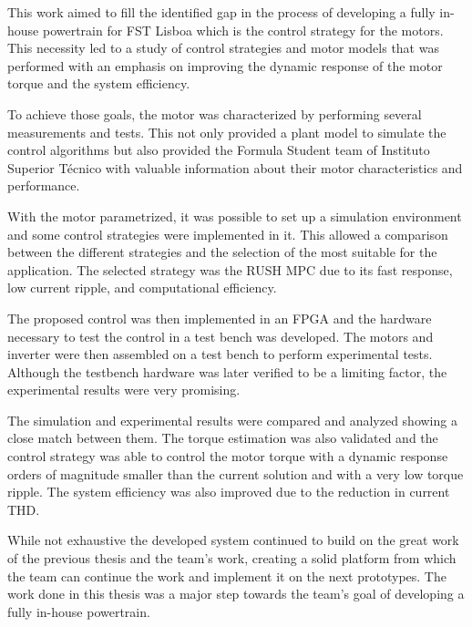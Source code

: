 \documentclass[9pt,conference]{IEEEtran}
\begin{document}
This work aimed to fill the identified gap in the process of developing a fully in-house powertrain for FST Lisboa which is the control strategy for the motors. This necessity led to a study of control strategies and motor models that was performed with an emphasis on improving the dynamic response of the motor torque and the system efficiency.

To achieve those goals, the motor was characterized by performing several measurements and tests. This not only provided a plant model to simulate the control algorithms but also provided the Formula Student team of Instituto Superior Técnico with valuable information about their motor characteristics and performance.

 With the motor parametrized, it was possible to set up a simulation environment and some control strategies were implemented in it. This allowed a comparison between the different strategies and the selection of the most suitable for the application. The selected strategy was the RUSH MPC due to its fast response, low current ripple, and computational efficiency. 

The proposed control was then implemented in an FPGA and the hardware necessary to test the control in a test bench was developed. The motors and inverter were then assembled on a test bench to perform experimental tests. Although the testbench hardware was later verified to be a limiting factor, the experimental results were very promising.

The simulation and experimental results were compared and analyzed showing a close match between them. The torque estimation was also validated and the control strategy was able to control the motor torque with a dynamic response orders of magnitude smaller than the current solution and with a very low torque ripple. The system efficiency was also improved due to the reduction in current THD.

While not exhaustive the developed system continued to build on the great work of the previous thesis and the team's work, creating a solid platform from which the team can continue the work and implement it on the next prototypes. The work done in this thesis was a major step towards the team's goal of developing a fully in-house powertrain.


% 
\def\BibTeX{{\rm B\kern-.05em{\sc i\kern-.025em b}\kern-.08em
    T\kern-.1667em\lower.7ex\hbox{E}\kern-.125emX}}
\end{document}
